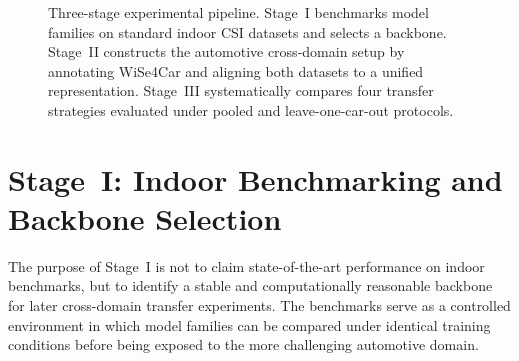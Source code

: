 \documentclass[english,bibtex]{kththesis}
\begin{document}
\begin{figure}[!ht]
\centering
{}
\caption{Three-stage experimental pipeline. Stage~I benchmarks model families on standard indoor CSI datasets and selects a backbone. Stage~II constructs the automotive cross-domain setup by annotating WiSe4Car and aligning both datasets to a unified representation. Stage~III systematically compares four transfer strategies evaluated under pooled and leave-one-car-out protocols.}
\label{fig:pipeline}
\end{figure}

\section{Stage~I: Indoor Benchmarking and Backbone Selection}
\label{sec:stage1}

The purpose of Stage~I is not to claim state-of-the-art performance on indoor benchmarks, but to identify a stable and computationally reasonable backbone for later cross-domain transfer experiments. The benchmarks serve as a controlled environment in which model families can be compared under identical training conditions before being exposed to the more challenging automotive domain.
\end{document}
